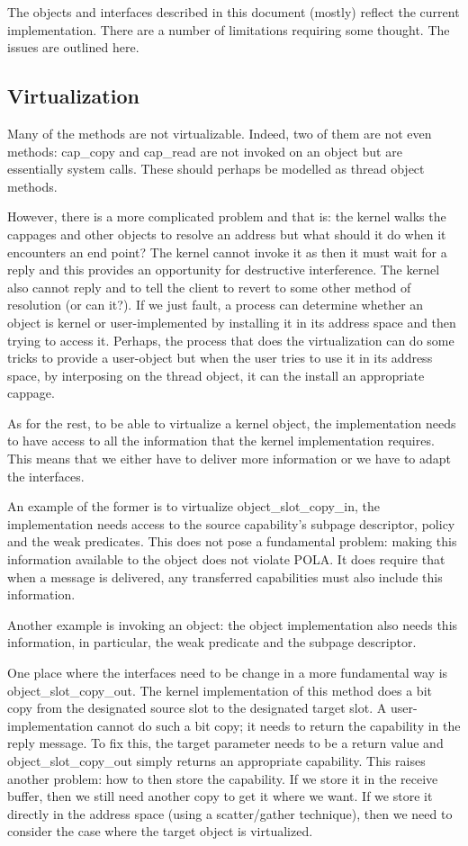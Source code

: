 \documentclass[12pt,a4paper]{book}
\begin{document}
The objects and interfaces described in this document (mostly) reflect
the current implementation.  There are a number of limitations
requiring some thought.  The issues are outlined here.

\subsection{Virtualization}

Many of the methods are not virtualizable.  Indeed, two of them are
not even methods: cap\_copy and cap\_read are not invoked on an object
but are essentially system calls.  These should perhaps be modelled as
thread object methods.

However, there is a more complicated problem and that is: the kernel
walks the cappages and other objects to resolve an address but what
should it do when it encounters an end point?  The kernel cannot
invoke it as then it must wait for a reply and this provides an
opportunity for destructive interference.  The kernel also cannot
reply and to tell the client to revert to some other method of
resolution (or can it?).  If we just fault, a process can determine
whether an object is kernel or user-implemented by installing it in
its address space and then trying to access it.  Perhaps, the process
that does the virtualization can do some tricks to provide a
user-object but when the user tries to use it in its address space, by
interposing on the thread object, it can the install an appropriate
cappage.

As for the rest, to be able to virtualize a kernel object, the
implementation needs to have access to all the information that the
kernel implementation requires.  This means that we either have to
deliver more information or we have to adapt the interfaces.

An example of the former is to virtualize object\_slot\_copy\_in, the
implementation needs access to the source capability's subpage
descriptor, policy and the weak predicates.  This does not pose a
fundamental problem: making this information available to the object
does not violate POLA.  It does require that when a message is
delivered, any transferred capabilities must also include this
information.

Another example is invoking an object: the object implementation also
needs this information, in particular, the weak predicate and the
subpage descriptor. 

One place where the interfaces need to be change in a more fundamental
way is object\_slot\_copy\_out.  The kernel implementation of this
method does a bit copy from the designated source slot to the
designated target slot.  A user-implementation cannot do such a bit
copy; it needs to return the capability in the reply message.  To fix
this, the target parameter needs to be a return value and
object\_slot\_copy\_out simply returns an appropriate capability.
This raises another problem: how to then store the capability.  If we
store it in the receive buffer, then we still need another copy to get
it where we want.  If we store it directly in the address space (using
a scatter/gather technique), then we need to consider the case where
the target object is virtualized.
\end{document}
